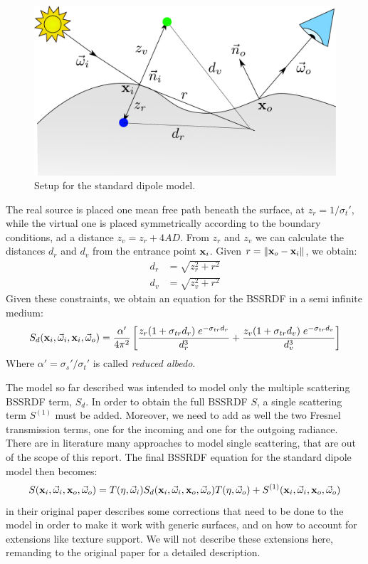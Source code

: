 \begin{figure}[!ht]
\centering
\includegraphics[width=\textwidth]{images/jensen.pdf}
\caption{Setup for the standard dipole model.}
\label{fig:jensen}
\end{figure}

The real source is placed one mean free path beneath the surface, at $z_r = 1 / \sigma_t'$, while the virtual one is placed symmetrically according to the boundary conditions, ad a distance $z_v = z_r + 4 A D$. From $z_r$ and $z_v$ we can calculate the distances $d_r$ and $d_v$ from the entrance point $\mathbf{x}_i$. Given $r = \|\mathbf{x}_o -\mathbf{x}_i\|$, we obtain:
\begin{equation*}
\begin{split}
d_r &= \sqrt{z_r^2 + r^2} \\
d_v &= \sqrt{z_v^2 + r^2}
\end{split}
\end{equation*}
Given these constraints, we obtain an equation for the BSSRDF in a semi infinite medium:
$$
S_d(\mathbf{x}_i,\vec{\omega}_i,\mathbf{x}_i,\vec{\omega}_o) = \frac{\alpha'}{4 \pi^2} \left[\frac{z_r (1 + \sigma_{tr} d_r) \; e^{-\sigma_{tr} d_r}}{d_r^3} + \frac{z_v (1 + \sigma_{tr} d_v) \; e^{-\sigma_{tr} d_v}}{d_v^3} \right]
$$
Where $\alpha' = \sigma_s' / \sigma_t'$ is called \emph{reduced albedo}.

The model so far described was intended to model only the multiple scattering BSSRDF term, $S_d$. In order to obtain the full BSSRDF $S$, a single scattering term $S^{(1)}$ must be added. Moreover, we need to add as well the two Fresnel transmission terms, one for the incoming and one for the outgoing radiance. There are in literature many approaches to model single scattering, that are out of the scope of this report. The final BSSRDF equation for the standard dipole model then becomes:
$$
S(\mathbf{x}_i, \vec{\omega}_i, \mathbf{x}_o, \vec{\omega}_o) = T(\eta,\vec{\omega}_i) S_d(\mathbf{x}_i, \vec{\omega}_i, \mathbf{x}_o, \vec{\omega}_o) T(\eta,\vec{\omega}_o) + S^{(1)}(\mathbf{x}_i, \vec{\omega}_i, \mathbf{x}_o, \vec{\omega}_o)
$$
\cite{Jensen:2001:PMS:383259.383319} in their original paper describes some corrections that need to be done to the model in order to make it work with generic surfaces, and on how to account for extensions like texture support. We will not describe these extensions here, remanding to the original paper for a detailed description.

